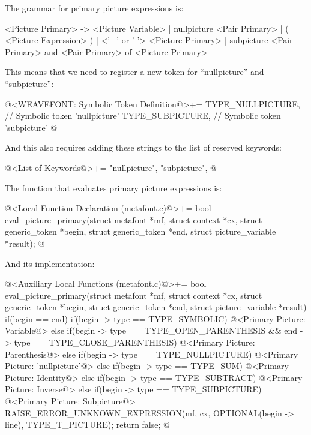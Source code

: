 {{{{{

The grammar for primary picture expressions is:

\alinhaverbatim
<Picture Primary> -> <Picture Variable> |
                     nullpicture <Pair Primary> |
                     ( <Picture Expression> ) |
                     <'+' or '-'> <Picture Primary> |
                     subpicture <Pair Primary> and <Pair Primary> of
                                <Picture Primary>
\alinhanormal

This means that we need to register a new token for ``nullpicture'' and
``subpicture'':

\iniciocodigo
@<WEAVEFONT: Symbolic Token Definition@>+=
TYPE_NULLPICTURE,        // Symbolic token 'nullpicture'
TYPE_SUBPICTURE,         // Symbolic token 'subpicture'
@
\fimcodigo

And this also requires adding these strings to the list of reserved
keywords:

\iniciocodigo
@<List of Keywords@>+=
"nullpicture", "subpicture",
@
\fimcodigo

The function that evaluates primary picture expressions is:

\iniciocodigo
@<Local Function Declaration (metafont.c)@>+=
bool eval_picture_primary(struct metafont *mf, struct context *cx,
                          struct generic_token *begin,
                          struct generic_token *end,
                          struct picture_variable *result);
@
\fimcodigo

And its implementation:

\iniciocodigo
@<Auxiliary Local Functions (metafont.c)@>+=
bool eval_picture_primary(struct metafont *mf, struct context *cx,
                         struct generic_token *begin,
                         struct generic_token *end,
                         struct picture_variable *result){
  if(begin == end){
    if(begin -> type == TYPE_SYMBOLIC){
      @<Primary Picture: Variable@>
    }
  }
  else{
    if(begin -> type == TYPE_OPEN_PARENTHESIS &&
      end -> type == TYPE_CLOSE_PARENTHESIS){
      @<Primary Picture: Parenthesis@>
    }
    else if(begin -> type == TYPE_NULLPICTURE){
      @<Primary Picture: 'nullpicture'@>
    }
    else if(begin -> type == TYPE_SUM){
      @<Primary Picture: Identity@>
    }
    else if(begin -> type == TYPE_SUBTRACT){
      @<Primary Picture: Inverse@>
    }
    else if(begin -> type == TYPE_SUBPICTURE){
      @<Primary Picture: Subpicture@>
    }
  }
  RAISE_ERROR_UNKNOWN_EXPRESSION(mf, cx, OPTIONAL(begin -> line),
                                 TYPE_T_PICTURE);
  return false;
}
@
\fimcodigo

}}}}}
